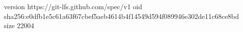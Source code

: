 version https://git-lfs.github.com/spec/v1
oid sha256:e0dfb1e5c61a63f67cbef5aeb4614b4f14549d594f089946e302de11c68ce8bd
size 22004
